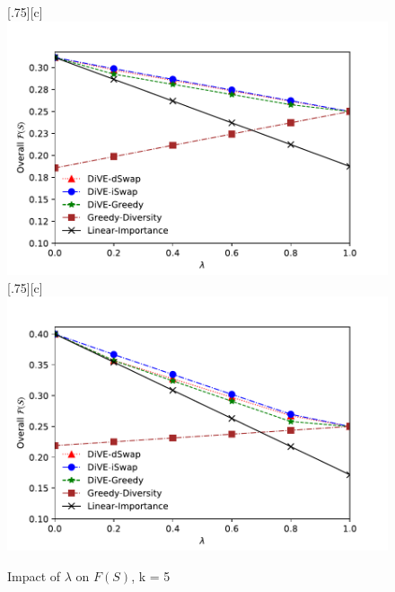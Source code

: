 \begin{figure}[t]
	\centering
	[.75\linewidth][c]{%
		\includegraphics[width=.75\linewidth]{figures/results/tradeoff_heart_2_color}} \\
		[.75\linewidth][c]{%
		\includegraphics[width=.75\linewidth]{figures/results/tradeoff_flights_color}}
	\caption{Impact of $\lambda$ on $F\left(S\right)$, k = 5}
	\label{fig:tradeoff_3_datasets}	
	
	\end{figure}






